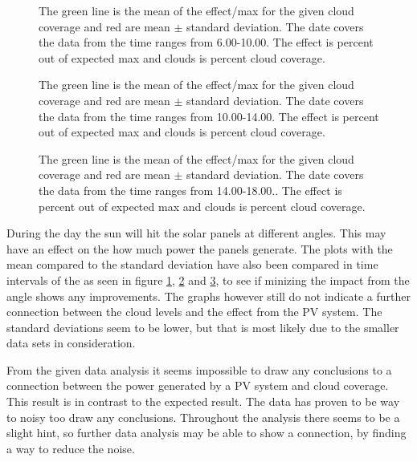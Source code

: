 \begin{figure}
  \centering
  \tiny
  
  \caption{The green line is the mean of the effect/max for the given
    cloud coverage and red are mean $\pm$ standard deviation.  The
    date covers the data from the time ranges from 6.00-10.00.  The
    effect is percent out of expected max and clouds is percent cloud
    coverage.}
  \label{fig:stat0610}
\end{figure}

\begin{figure}
  \centering
  \tiny
  
  \caption{The green line is the mean of the effect/max for the given
    cloud coverage and red are mean $\pm$ standard deviation.  The
    date covers the data from the time ranges from 10.00-14.00.  The
    effect is percent out of expected max and clouds is percent cloud
    coverage.}
  \label{fig:stat1014}
\end{figure}

\begin{figure}
  \centering
  \tiny
  
  \caption{The green line is the mean of the effect/max for the given
    cloud coverage and red are mean $\pm$ standard deviation.  The
    date covers the data from the time ranges from 14.00-18.00..  The
    effect is percent out of expected max and clouds is percent cloud
    coverage.}
  \label{fig:stat1418}
\end{figure}

During the day the sun will hit the solar panels at different angles.
This may have an effect on the how much power the panels generate.
The plots with the mean compared to the standard deviation have also
been compared in time intervals of the as seen in figure
\ref{fig:stat0610}, \ref{fig:stat1014} and \ref{fig:stat1418}, to see
if minizing the impact from the angle shows any improvements.  The
graphs however still do not indicate a further connection between the
cloud levels and the effect from the PV system.  The standard
deviations seem to be lower, but that is most likely due to the
smaller data sets in consideration.

From the given data analysis it seems impossible to draw any
conclusions to a connection between the power generated by a PV system
and cloud coverage.  This result is in contrast to the expected
result.  The data has proven to be way to noisy too draw any
conclusions.  Throughout the analysis there seems to be a slight hint,
so further data analysis may be able to show a connection, by finding
a way to reduce the noise.

